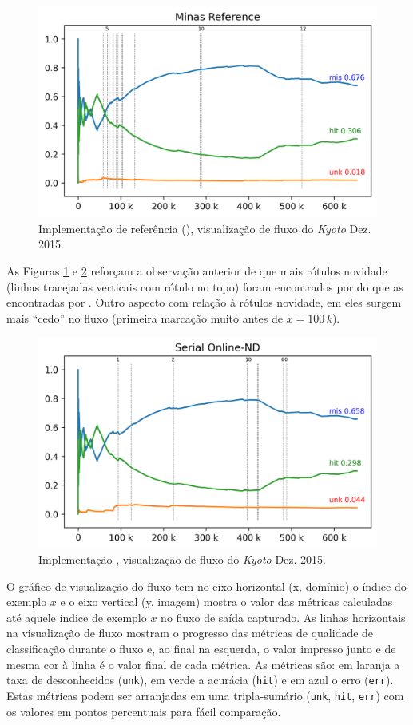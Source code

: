 \begin{figure}[htb]
  \centering
  \includegraphics[width=0.75\linewidth]{experiments/revised-java-log.png}
  \caption{Implementação de referência (), visualização de fluxo do \dataset \emph{Kyoto} Dez. 2015.}
  \label{fig:validation-java}
\end{figure}

As Figuras \ref{fig:validation-java} e \ref{fig:validation-serial} reforçam a
observação anterior de que mais rótulos novidade (linhas tracejadas verticais
com rótulo no topo) foram encontrados por  do que as encontradas por
\serial.
Outro aspecto com relação à rótulos novidade, em  eles surgem mais
``cedo'' no fluxo (primeira marcação muito antes de $x = 100\,k$).

\begin{figure}[htb]
  \centering
  \includegraphics[width=0.75\linewidth]{experiments/online-nd-log.png}
  \caption{Implementação \serial, visualização de fluxo do \dataset \emph{Kyoto} Dez. 2015.}
  \label{fig:validation-serial}
\end{figure}

O gráfico de visualização do fluxo tem no eixo horizontal (x, domínio) o índice
do exemplo $x$ e o eixo vertical (y, imagem) mostra o valor das métricas
calculadas até aquele índice de exemplo $x$ no fluxo de saída capturado.
As linhas horizontais na visualização de fluxo mostram o progresso das métricas
de qualidade de classificação durante o fluxo e, ao final na esquerda, o valor
impresso junto e de mesma cor à linha é o valor final de cada métrica.
As métricas são: 
em laranja a taxa de desconhecidos (\texttt{unk}),
em verde a acurácia (\texttt{hit}) e
em azul o erro (\texttt{err}).
Estas métricas podem ser arranjadas em uma tripla-sumário
(\texttt{unk}, \texttt{hit}, \texttt{err})
com os valores em pontos percentuais para fácil comparação.

